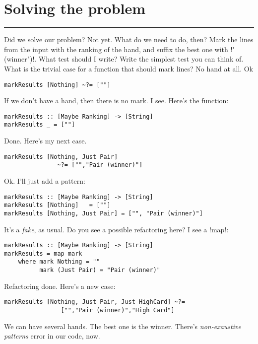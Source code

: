 \newpage
\section{Solving the problem} 
\vspace{10cm}
\hrule

\lhQ Did we solve our problem?
\lhA Not yet. 
\lhN What do we need to do, then?
\lhA Mark the lines from the input with the ranking of the hand, and suffix the best one with \il!"(winner")!.
\lhN What test should I write?
\lhA Write the simplest test you can think of.
\lhN What is the trivial case for a function that should mark lines?
\lhA No hand at all.
\lhN Ok
\begin{lstlisting}[frame=single]
markResults [Nothing] ~?= [""]
\end{lstlisting}
If we don't have a hand, then there is no mark.
\lhA \error I see. Here's the function:
\begin{lstlisting}[frame=single]
markResults :: [Maybe Ranking] -> [String]
markResults _ = [""]
\end{lstlisting}
\success Done.
\lhN Here's my next case. 
\begin{lstlisting}[frame=single]
markResults [Nothing, Just Pair] 
               ~?= ["","Pair (winner)"]
\end{lstlisting}
\lhA \failure Ok. I'll just add a pattern:
\begin{lstlisting}[frame=single]
markResults :: [Maybe Ranking] -> [String]
markResults [Nothing]   = [""]
markResults [Nothing, Just Pair] = ["", "Pair (winner)"]
\end{lstlisting}
\success It's a \emph{fake}, as usual.
\lhN Do you see a possible refactoring here?
\lhA I see a \il!map!:
\begin{lstlisting}[frame=single]
markResults :: [Maybe Ranking] -> [String]
markResults = map mark
    where mark Nothing = ""
          mark (Just Pair) = "Pair (winner)"
\end{lstlisting}
\success Refactoring done.
\lhN Here's a new case:
\begin{lstlisting}[frame=single]
markResults [Nothing, Just Pair, Just HighCard] ~?= 
                ["","Pair (winner)","High Card"]
\end{lstlisting}
\error We can have several hands. The best one is the winner.
There's \emph{non-exaustive patterns} error in our code, now.
